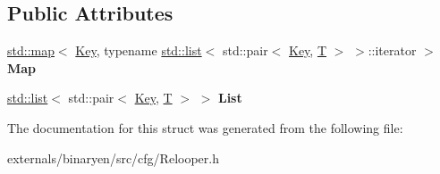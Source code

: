 \subsection*{Public Attributes}
\begin{DoxyCompactItemize}
\item 
\mbox{\label{struct_c_f_g_1_1_insert_ordered_map_abba6b42f37163a2906736463af4296ee}} 
\mbox{\hyperlink{classstd_1_1map}{std\+::map}}$<$ \mbox{\hyperlink{struct_key}{Key}}, typename \mbox{\hyperlink{classstd_1_1list}{std\+::list}}$<$ std\+::pair$<$ \mbox{\hyperlink{struct_key}{Key}}, \mbox{\hyperlink{struct_t}{T}} $>$ $>$\+::iterator $>$ {\bfseries Map}
\item 
\mbox{\label{struct_c_f_g_1_1_insert_ordered_map_a90269b865d322727603d125767c5d452}} 
\mbox{\hyperlink{classstd_1_1list}{std\+::list}}$<$ std\+::pair$<$ \mbox{\hyperlink{struct_key}{Key}}, \mbox{\hyperlink{struct_t}{T}} $>$ $>$ {\bfseries List}
\end{DoxyCompactItemize}


The documentation for this struct was generated from the following file\+:\begin{DoxyCompactItemize}
\item 
externals/binaryen/src/cfg/Relooper.\+h\end{DoxyCompactItemize}
